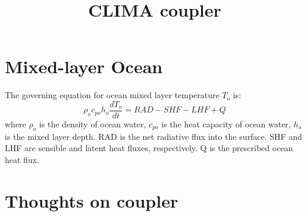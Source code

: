 \documentclass{article}
\title{CLIMA coupler}
\author{ }
\begin{document}
\maketitle

\section{Mixed-layer Ocean}
The governing equation for ocean mixed layer temperature $T_o$ is:
\begin{equation}
\rho_o c_{po} h_o \frac{dT_o}{dt} = RAD - SHF - LHF + Q
\end{equation}
where $\rho_o$ is the density of ocean water, $c_{po}$ is the heat capacity of ocean water, $h_o$ is the mixed layer depth. RAD is the net radiative flux into the surface. SHF and LHF are sensible and latent heat fluxes, respectively. Q is the prescribed ocean heat flux.

\section {Thoughts on coupler}
\end{document}
